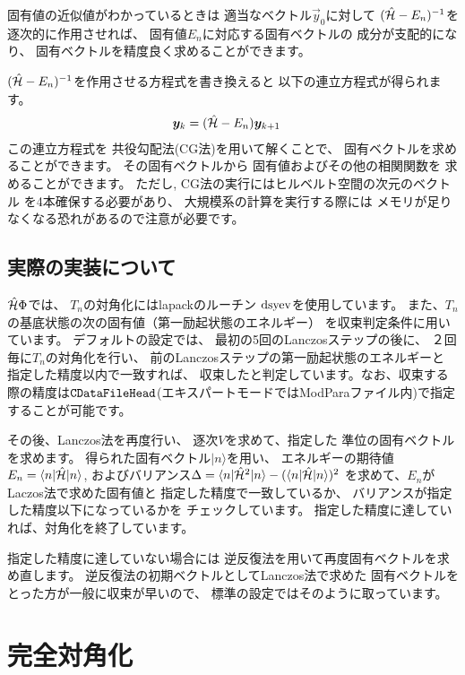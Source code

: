 固有値の近似値がわかっているときは
適当なベクトル$\vec{y}_{0}$に対して
$(\hat{\mathcal{H}}-E_{n})^{-1}$を
逐次的に作用させれば、
固有値$E_{n}$に対応する固有ベクトルの
成分が支配的になり、
固有ベクトルを精度良く求めることができます。

$(\hat{\mathcal{H}}-E_{n})^{-1}$を作用させる方程式を書き換えると
以下の連立方程式が得られます。
\begin{align}
\boldsymbol y_{k}&=(\hat{\mathcal{H}}-E_{n})\boldsymbol y_{k+1}
\end{align}
この連立方程式を
共役勾配法(CG法)を用いて解くことで、
固有ベクトルを求めることができます。
その固有ベクトルから
固有値およびその他の相関関数を
求めることができます。
ただし, CG法の実行にはヒルベルト空間の次元のベクトル
を4本確保する必要があり、
大規模系の計算を実行する際には
メモリが足りなくなる恐れがあるので注意が必要です。


\subsection{実際の実装について}
$\hat{\mathcal{H}}\Phi$では、
$T_{n}$の対角化にはlapackのルーチン
$\rm dsyev$を使用しています。
また、$T_{n}$の基底状態の次の固有値（第一励起状態のエネルギー）
を収束判定条件に用いています。
デフォルトの設定では、
最初の5回のLanczosステップの後に、
２回毎に$T_{n}$の対角化を行い、
前のLanczosステップの第一励起状態のエネルギーと
指定した精度以内で一致すれば、
収束したと判定しています。なお、収束する際の精度は$\verb|CDataFileHead| $(エキスパートモードではModParaファイル内)で指定することが可能です。

その後、Lanczos法を再度行い、
逐次$V$を求めて、指定した
準位の固有ベクトルを求めます。
得られた固有ベクトル$|n\rangle$を用い、
エネルギーの期待値$E_{n}=\langle n|\hat{\mathcal{H}}|n\rangle $,
およびバリアンス$\Delta=\langle n|\hat{\mathcal{H}}^{2}|n\rangle -(\langle n|\hat{\mathcal{H}}|n\rangle)^2$
を求めて、$E_{n}$がLaczos法で求めた固有値と
指定した精度で一致しているか、
バリアンスが指定した精度以下になっているかを
チェックしています。
指定した精度に達していれば、対角化を終了しています。

指定した精度に達していない場合には
逆反復法を用いて再度固有ベクトルを求め直します。
逆反復法の初期ベクトルとしてLanczos法で求めた
固有ベクトルをとった方が一般に収束が早いので、
標準の設定ではそのように取っています。

\section{完全対角化}
\label{Ch:AllDiagonalization}

